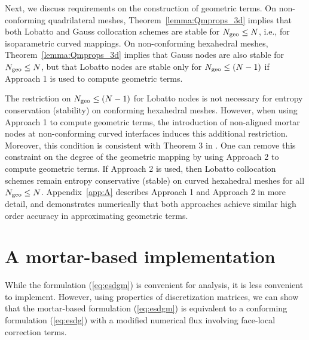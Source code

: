 \documentclass{svjour3}                     %
\renewcommand{\note}[1]{{\color{blue}{#1}}}
\begin{document}
Next, we discuss requirements on the construction of geometric terms.  On non-conforming quadrilateral meshes, Theorem~\ref{lemma:Qmprops_3d} implies that both Lobatto and Gauss collocation schemes are stable for $N_{\rm geo}\leq N$, i.e., for isoparametric curved mappings.  On non-conforming hexahedral meshes, Theorem~\ref{lemma:Qmprops_3d} implies that Gauss nodes are also stable for $N_{\rm geo}\leq N$, but that Lobatto nodes are stable only for $N_{\rm geo} \leq (N-1)$ if Approach 1 \cite{kopriva2006metric} is used to compute geometric terms.  

The restriction on $N_{\rm geo} \leq (N-1)$ for Lobatto nodes is not necessary for entropy conservation (stability) on conforming hexahedral meshes.  However, when using Approach 1 to compute geometric terms, the introduction of non-aligned mortar nodes at non-conforming curved interfaces induces this additional restriction.  Moreover, this condition is consistent with Theorem 3 in \cite{fernandez2019entropy}.  One can remove this constraint on the degree of the geometric mapping by using Approach 2 \cite{kozdon2018energy} to compute geometric terms.  If Approach 2 is used, then Lobatto collocation schemes remain entropy conservative (stable) on curved hexahedral meshes for all $N_{\rm geo} \leq N$.  Appendix~\ref{app:A} describes Approach 1 \cite{kopriva2006metric} and Approach 2 \cite{kozdon2018energy} in more detail, and demonstrates numerically that both approaches achieve similar high order accuracy in approximating geometric terms.






\section{A mortar-based implementation}
\label{sec:mortarimplement}
While the formulation (\ref{eq:esdgm}) is convenient for analysis, it is less convenient to implement.  However, using properties of discretization matrices, we can show that the mortar-based formulation (\ref{eq:esdgm}) is equivalent to a conforming formulation (\ref{eq:esdg}) with a modified numerical flux involving face-local correction terms.  
\end{document}
